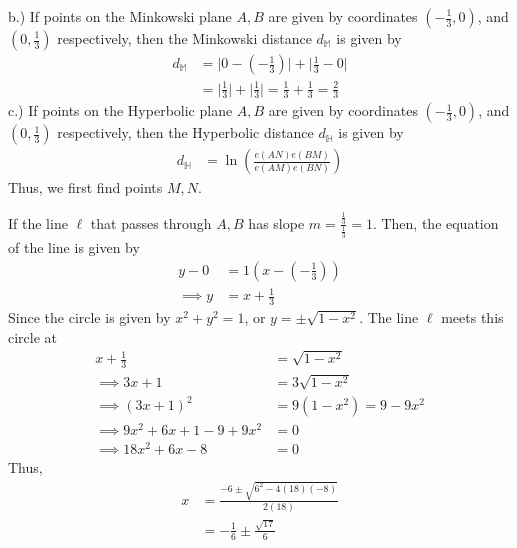 \documentclass{report}
\begin{document}
    b.) If points on the Minkowski plane $A,B$ are given by coordinates $\left(-\frac{1}{3},0\right)$, and $\left(0,\frac{1}{3}\right) $ respectively, then the Minkowski distance $d_{\mathbb{M}}$ is given by
    \begin{align*}
        d_{\mathbb{M}} &= \bigg\lvert 0-\left(-\frac{1}{3}\right) \bigg\rvert + \bigg\lvert \frac{1}{3}-0 \bigg\rvert \\
                       &= \bigg\lvert \frac{1}{3} \bigg\rvert + \bigg\lvert \frac{1}{3} \bigg\rvert = \frac{1}{3} + \frac{1}{3} = \frac{2}{3}
    \end{align*}
    c.) If points on the Hyperbolic plane $A,B$ are given by coordinates $\left(-\frac{1}{3},0\right)$, and $\left(0,\frac{1}{3}\right) $ respectively, then the Hyperbolic distance $d_{\mathbb{H}}$ is given by
    \begin{align*}
        d_{\mathbb{H}} &= \ln{\left(\frac{e(AN)e(BM)}{e(AM)e(BN)}\right)}
    \end{align*}
    Thus, we first find points $M,N$. 
    \bigbreak \noindent 
    \begin{figure}[ht]
        \centering
        \label{fig:hyper1}
    \end{figure}
    \bigbreak \noindent 
    If the line $\ell$ that passes through $A,B$ has slope $m= \frac{\frac{1}{3}}{\frac{1}{3}} =1 $. Then, the equation of the line is given by
    \begin{align*}
        y-0 &= 1\left(x-\left(-\frac{1}{3}\right)\right) \\
        \implies y &= x  + \frac{1}{3}
    \end{align*}
    Since the circle is given by $x^{2} + y^{2} = 1$, or $y = \pm \sqrt{ 1- x^{2}}$. The line $\ell$ meets this circle at 
    \begin{align*}
        x + \frac{1}{3} &= \sqrt{1-x^{2}} \\
        \implies 3x + 1 &= 3\sqrt{1-x^{2}} \\
        \implies (3x+1)^{2} &= 9(1-x^{2}) = 9-9x^{2} \\
        \implies 9x^{2} + 6x + 1 - 9 + 9x^{2} &= 0 \\
        \implies 18x^{2} + 6x - 8 &=0
    \end{align*}
    Thus,
    \begin{align*}
        x &= \frac{-6 \pm \sqrt{6^{2} - 4(18)(-8)}}{2(18)} \\
          &= -\frac{1}{6}\pm \frac{\sqrt{17}}{6}
    \end{align*}
\end{document}
